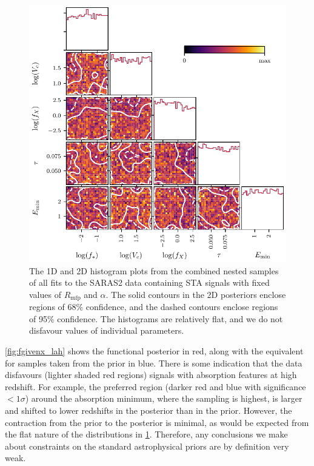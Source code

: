 \begin{figure}
    \centering
    \includegraphics{saras2/figs/lyh_merged_samples_posterior_fixed_rmfp_alpha_hist.pdf}
    \caption{The 1D and 2D histogram plots from the combined nested samples of all fits to the SARAS2 data containing STA signals with fixed values of $R_\mathrm{mfp}$ and $\alpha$. The solid contours in the 2D posteriors enclose regions of 68\% confidence, and the dashed contours enclose regions of 95\% confidence.
    The histograms are relatively flat, and we do not disfavour values of individual parameters.}
    \label{fig:combined_samples_lyh_fra}
\end{figure}


\cref{fig:fgivenx_lah} shows the functional posterior in red, along with the equivalent for samples taken from the prior in blue. There is some indication that the data disfavours (lighter shaded red regions) signals with absorption features at high redshift. For example, the preferred region (darker red and blue with significance $<1\sigma$) around the absorption minimum, where the sampling is highest, is larger and shifted to lower redshifts in the posterior than in the prior. However, the contraction from the prior to the posterior is minimal, as would be expected from the flat nature of the distributions in \cref{fig:combined_samples_lyh_fra}. Therefore, any conclusions we make about constraints on the standard astrophysical priors are by definition very weak. 

